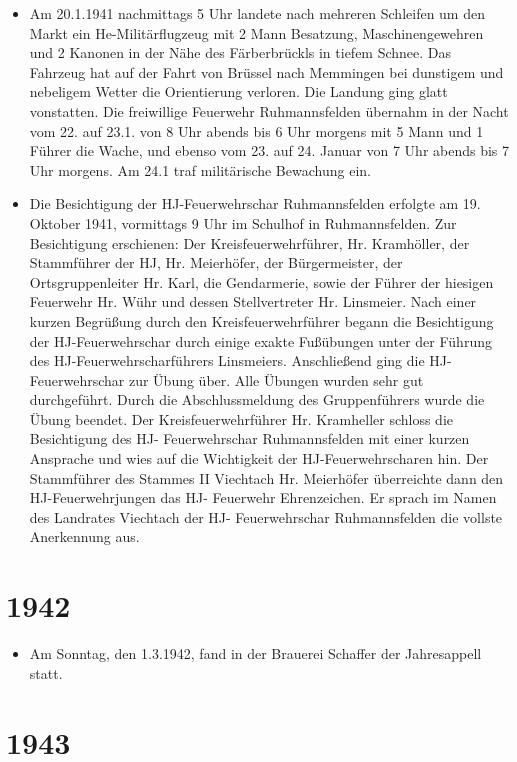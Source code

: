 \documentclass[12pt,a4paper]{book}
\begin{document}
\begin{itemize}
\item Am 20.1.1941 nachmittags 5 Uhr landete nach mehreren Schleifen um den
Markt ein He-Militärflugzeug mit 2 Mann Besatzung, Maschinengewehren und 2
Kanonen in der Nähe des Färberbrückls in tiefem Schnee. Das Fahrzeug hat auf der
Fahrt von Brüssel nach Memmingen bei dunstigem und nebeligem Wetter die
Orientierung verloren. Die Landung ging glatt vonstatten. Die freiwillige
Feuerwehr Ruhmannsfelden übernahm in der Nacht vom 22. auf 23.1. von 8 Uhr
abends bis 6 Uhr morgens mit 5 Mann und 1 Führer die Wache, und ebenso vom 23.
auf 24. Januar von 7 Uhr abends bis 7 Uhr morgens. Am 24.1 traf militärische
Bewachung ein.

\item Die Besichtigung der HJ-Feuerwehrschar Ruhmannsfelden erfolgte am 19.
Oktober 1941, vormittags 9 Uhr im Schulhof in Ruhmannsfelden. Zur Besichtigung
erschienen: Der Kreisfeuerwehrführer, Hr. Kramhöller, der Stammführer der HJ,
Hr. Meierhöfer, der Bürgermeister, der Ortsgruppenleiter Hr. Karl, die
Gendarmerie, sowie der Führer der hiesigen Feuerwehr Hr. Wühr und dessen
Stellvertreter Hr. Linsmeier. Nach einer kurzen Begrüßung durch den
Kreisfeuerwehrführer begann die Besichtigung der HJ-Feuerwehrschar durch einige
exakte Fußübungen unter der Führung des HJ-Feuerwehrscharführers Linsmeiers.
Anschließend ging die HJ- Feuerwehrschar zur Übung über. Alle Übungen wurden
sehr gut durchgeführt. Durch die Abschlussmeldung des Gruppenführers wurde die
Übung beendet. Der Kreisfeuerwehrführer Hr. Kramheller schloss die Besichtigung
des HJ- Feuerwehrschar Ruhmannsfelden mit einer kurzen Ansprache und wies auf
die Wichtigkeit der HJ-Feuerwehrscharen hin. Der Stammführer des Stammes II
Viechtach Hr. Meierhöfer überreichte dann den HJ-Feuerwehrjungen das HJ-
Feuerwehr Ehrenzeichen. Er sprach im Namen des Landrates Viechtach der HJ-
Feuerwehrschar Ruhmannsfelden die vollste Anerkennung aus.
\end{itemize}

\section*{1942}

\begin{itemize}
\item Am Sonntag, den 1.3.1942, fand in der Brauerei Schaffer der Jahresappell
statt.
\end{itemize}

\section*{1943}
\end{document}

